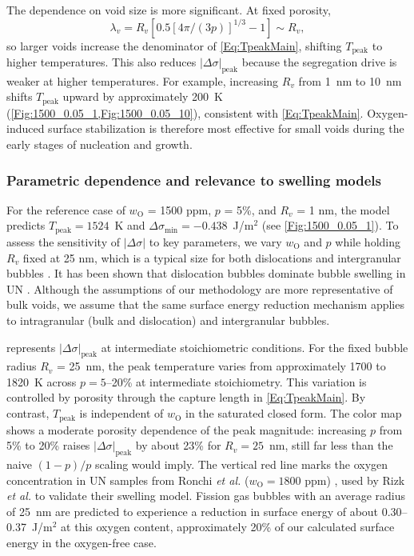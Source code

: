 \documentclass[preprint,12pt,sort&compress]{elsarticle}
\newcommand{\?}{\stackrel{?}{=}}
\begin{document}
The dependence on void size is more significant. At fixed porosity,
\begin{equation}
\lambda_v = R_v \left[ 0.5 \left[ 4\pi/(3p) \right]^{1/3} - 1 \right] \sim R_v,
\end{equation}
so larger voids increase the denominator of \cref{Eq:TpeakMain}, shifting $T_\text{peak}$ to higher temperatures. This also reduces $|\Delta\sigma|_\text{peak}$ because the segregation drive is weaker at higher temperatures. For example, increasing $R_v$ from 1~nm to 10~nm shifts $T_\text{peak}$ upward by approximately 200~K (\cref{Fig:1500_0.05_1,Fig:1500_0.05_10}), consistent with \cref{Eq:TpeakMain}. Oxygen-induced surface stabilization is therefore most effective for small voids during the early stages of nucleation and growth.

\subsubsection{Parametric dependence and relevance to swelling models}

For the reference case of $w_\text{O}$ = 1500 ppm, $p$ = 5\%, and $R_v$ = 1 nm, the model predicts $T_\text{peak}=1524$~K and $\Delta \sigma_\text{min}=-0.438$~J/m$^2$ (see \cref{Fig:1500_0.05_1}). To assess the sensitivity of $|\Delta \sigma|$ to key parameters, we vary $w_\text{O}$ and $p$ while holding $R_v$ fixed at 25 nm, which is a typical size for both dislocations and intergranular bubbles \cite{Colin1983}. It has been shown that dislocation bubbles dominate bubble swelling in UN \cite{Ronchi1975,Ronchi1978,Rizk2025}. Although the assumptions of our methodology are more representative of bulk voids, we assume that the same surface energy reduction mechanism applies to intragranular (bulk and dislocation) and intergranular bubbles.

 represents $|\Delta \sigma|_\text{peak}$ at intermediate stoichiometric conditions. For the fixed bubble radius $R_v$ = 25~nm, the peak temperature varies from approximately 1700 to 1820~K across $p=5$--20\% at intermediate stoichiometry. This variation is controlled by porosity through the capture length in \cref{Eq:TpeakMain}. By contrast, $T_\text{peak}$ is independent of $w_\text{O}$ in the saturated closed form. The color map shows a moderate porosity dependence of the peak magnitude: increasing $p$ from 5\% to 20\% raises $|\Delta\sigma|_\text{peak}$ by about 23\% for $R_v=25$~nm, still far less than the naive $(1-p)/p$ scaling would imply. The vertical red line marks the oxygen concentration in UN samples from Ronchi \textit{et al.} ($w_\text{O} = 1800$ ppm) \cite{Ronchi1975,Ronchi1978}, used by Rizk \textit{et al.} \cite{Rizk2025} to validate their swelling model. Fission gas bubbles with an average radius of 25~nm are predicted to experience a reduction in surface energy of about 0.30--0.37~J/m$^2$ at this oxygen content, approximately 20\% of our calculated surface energy in the oxygen-free case.
\end{document}
